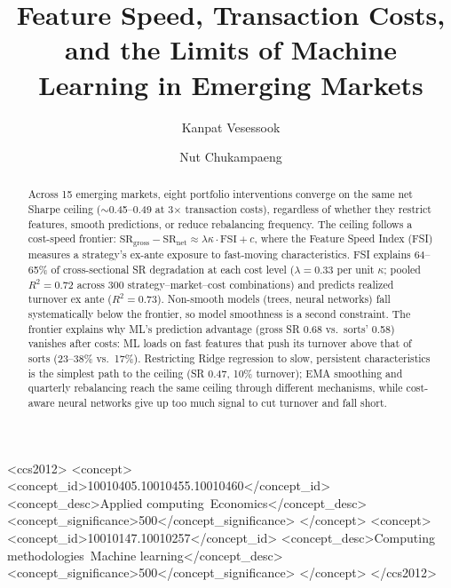 \documentclass[sigconf,balance=false]{acmart}
\begin{document}
\title{Feature Speed, Transaction Costs, and the Limits of Machine Learning in Emerging Markets}

\author{Kanpat Vesessook}

\author{Nut Chukampaeng}

\renewcommand{\shortauthors}{Vesessook and Chukampaeng}

\begin{abstract}
Across 15 emerging markets, eight portfolio interventions
converge on the same net Sharpe ceiling (${\sim}$0.45--0.49 at
3$\times$ transaction costs), regardless of whether they restrict
features, smooth predictions, or reduce
rebalancing frequency. The ceiling follows a cost-speed frontier: $\text{SR}_{\text{gross}} - \text{SR}_{\text{net}}
\approx \lambda \kappa \cdot \text{FSI} + c$, where the Feature Speed
Index (FSI) measures a strategy's ex-ante exposure to fast-moving
characteristics. FSI explains 64--65\% of cross-sectional SR
degradation at each cost level ($\lambda = 0.33$ per unit $\kappa$;
pooled $R^2 = 0.72$ across 300 strategy--market--cost combinations)
and predicts realized turnover ex ante ($R^2 = 0.73$).
Non-smooth models (trees, neural networks) fall systematically below
the frontier, so model smoothness is a second constraint.
The frontier explains why ML's prediction advantage (gross SR 0.68 vs.\
sorts' 0.58) vanishes after costs: ML loads on fast features that
push its turnover above that of sorts (23--38\% vs.\ 17\%). Restricting Ridge regression to
slow, persistent characteristics is the simplest path to the ceiling
(SR 0.47, 10\% turnover); EMA smoothing and quarterly rebalancing
reach the same ceiling through different mechanisms, while cost-aware
neural networks give up too much signal to cut turnover and fall short.
\end{abstract}

\begin{CCSXML}
<ccs2012>
<concept>
<concept_id>10010405.10010455.10010460</concept_id>
<concept_desc>Applied computing~Economics</concept_desc>
<concept_significance>500</concept_significance>
</concept>
<concept>
<concept_id>10010147.10010257</concept_id>
<concept_desc>Computing methodologies~Machine learning</concept_desc>
<concept_significance>500</concept_significance>
</concept>
</ccs2012>
\end{CCSXML}
\end{document}
